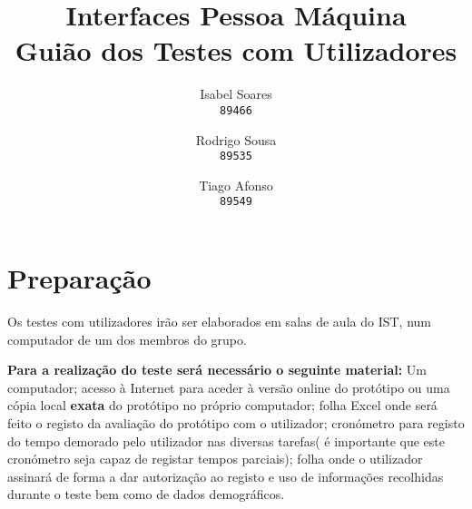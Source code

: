 \documentclass[12pt]{article}
\author{
  Isabel Soares\\
  \texttt{89466}
  \and
  Rodrigo Sousa\\
  \texttt{89535}
  \and
  Tiago Afonso\\
  \texttt{89549}
}
\title{Interfaces Pessoa Máquina\\
Guião dos Testes com Utilizadores}
\begin{document}
    

\maketitle

\section*{Preparação}
    Os testes com utilizadores irão ser elaborados em salas de aula do IST, num computador de um dos membros do grupo.
    
    \textbf{Para a realização do teste será necessário o seguinte material:}
    Um computador; acesso à Internet para aceder à versão online do protótipo ou uma cópia local \textbf{exata} do protótipo no próprio computador; folha Excel onde será feito o registo da avaliação do protótipo com o utilizador; cronómetro para registo do tempo demorado pelo utilizador nas diversas tarefas( é importante que este cronómetro seja capaz de registar tempos parciais); folha onde o utilizador assinará de forma a dar autorização ao registo e uso de informações recolhidas durante o teste bem como de dados demográficos.
\end{document}
